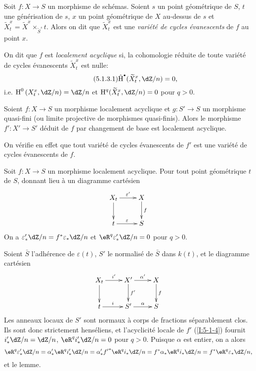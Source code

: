 \begin{definition}\label{I:5-1-3}
Soit $f:X\to S$ un morphisme de schémas. Soient $s$ un point géométrique de 
$S$, $t$ une générisation de $s$, $x$ un point géométrique de $X$ 
au-dessus de $s$ et 
$\widetilde X_t^x = \widetilde X^x\times_{\widetilde S^s} t$. Alors on dit que 
$\widetilde X_t^x$ est une \emph{variété de cycles évanescents} de $f$ au 
point $x$. 

On dit que $f$ est \emph{localement acyclique} si, la cohomologie réduite de 
toute variété de cycles évanescents $\widetilde X_t^x$ est nulle:
\begin{equation*}\tag{5.1.3.1}\label{I:eq:5-1-3-1}
  \hat\h^\bullet(\widetilde X_t^x,\dZ/n) = 0\text{,}
\end{equation*}
i.e. $\h^0\left(X_t^x,\dZ/n\right) = \dZ/n$ et 
$\h^q(\widetilde X_t^x,\dZ/n) = 0$ pour $q>0$. 
\end{definition}





\begin{lemma}\label{I:5-1-4}
Soient $f:X\to S$ un morphisme localement acyclique et $g:S'\to S$ un morphisme 
quasi-fini (ou limite projective de morphismes quasi-finis). Alors le 
morphisme $f':X'\to S'$ déduit de $f$ par changement de base est localement 
acyclique.
\end{lemma}

On vérifie en effet que tout variété de cycles évanescents de $f'$ est 
une variété de cycles évanescents de $f$.  	





\begin{lemma}\label{I:5-1-5}
Soit $f:X\to S$ un morphisme localement acyclique. Pour tout point géométrique 
$t$ de $S$, donnant lieu à un diagramme cartésien 
\[\xymatrix{
  X_t \ar[r]^-{\varepsilon'} \ar[d] 
    & X \ar[d]^-f \\
  t \ar[r]^-\varepsilon 
    & S
}\]
On a $\varepsilon_*' \dZ/n = f^*\varepsilon_* \dZ/n$ et $\eR^q \varepsilon_*'\dZ/n=0$ 
pour $q>0$. 
\end{lemma}

Soient $\bar S$ l'adhérence de $\varepsilon(t)$, $S'$ le normalisé de $\bar S$ 
dans $k(t)$, et le diagramme cartésien 
\[\xymatrix{
  X_t \ar[r]^-{i'} \ar[d] 
    & X' \ar[r]^-{\alpha'} \ar[d]^-{f'} 
    & X \ar[d]^-f \\
  t \ar[r]^-i 
    & S' \ar[r]^-\alpha 
    & S
}\]
Les anneaux locaux de $S'$ sont normaux à corps de fractions séparablement 
clos. Ils sont donc strictement henséliens, et l'acyclicité locale de $f'$ 
(\ref{I:5-1-4}) fournit $i_*'\dZ/n = \dZ/n$, $\eR^qi_*'\dZ/n = 0$ pour $q>0$. 
Puisque $\alpha$ est entier, on a alors 
\[
  \eR^q\varepsilon_*'\dZ/n 
    = \alpha_*' \eR^q i_*' \dZ/n 
    = \alpha_*' {f'}^* \eR^q i_* \dZ/n 
    = f^* \alpha_* \eR^q i_* \dZ/n 
    = f^* \eR^q \varepsilon_* \dZ/n \text{,}
\]
et le lemme. 





